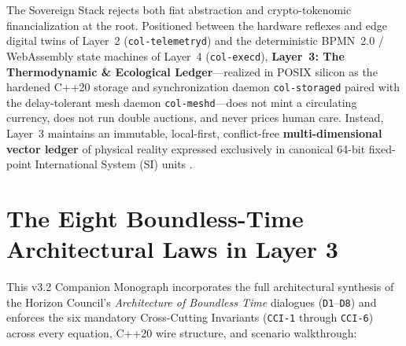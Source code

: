 The Sovereign Stack rejects both fiat abstraction and crypto-tokenomic financialization at the root. Positioned between the hardware reflexes and edge digital twins of Layer~2 (\texttt{col-telemetryd}) and the deterministic BPMN~2.0 / WebAssembly state machines of Layer~4 (\texttt{col-execd}), \textbf{Layer~3: The Thermodynamic \& Ecological Ledger}---realized in POSIX silicon as the hardened C++20 storage and synchronization daemon \texttt{col-storaged} paired with the delay-tolerant mesh daemon \texttt{col-meshd}---does not mint a circulating currency, does not run double auctions, and never prices human care. Instead, Layer~3 maintains an immutable, local-first, conflict-free \textbf{multi-dimensional vector ledger} of physical reality expressed exclusively in canonical 64-bit fixed-point International System (SI) units \parencite{bipm2019si,neurath1919,odum1996environmental}.

\section*{The Eight Boundless-Time Architectural Laws in Layer 3}

This v3.2 Companion Monograph incorporates the full architectural synthesis of the Horizon Council's \textit{Architecture of Boundless Time} dialogues (\texttt{D1}--\texttt{D8}) and enforces the six mandatory Cross-Cutting Invariants (\texttt{CCI-1} through \texttt{CCI-6}) across every equation, C++20 wire structure, and scenario walkthrough:

